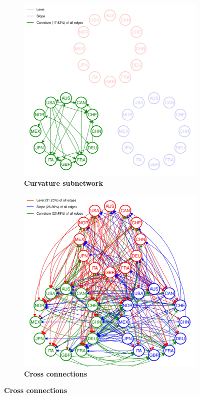 \documentclass[12pt,bibliography=totoc]{article}
\begin{document}
\begin{figure}[H]
  \medskip

  \begin{subfigure}[t]{.35\textwidth}
    \centering
    \includegraphics[width=\linewidth]{All_plot_onlycurv_2004-07-01_2019-12-31_0.01-page-001}
    \caption{\textbf{Curvature subnetwork}}
  \end{subfigure}
  \hfill
  \begin{subfigure}[t]{.35\textwidth}
    \centering
    \includegraphics[width=\linewidth]{All_plot_innerempty_2004-07-01_2019-12-31_0.01-page-001}
    \caption{\textbf{Cross connections}}
  \end{subfigure}
\end{figure}
\end{document}
